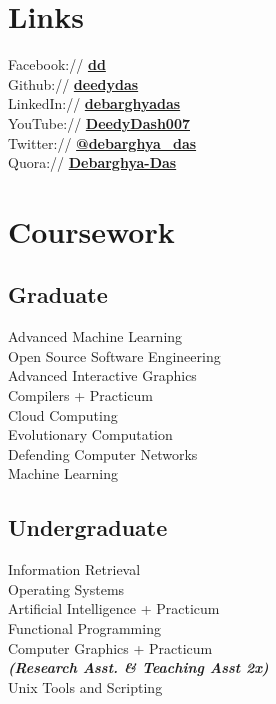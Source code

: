 \documentclass[]{deedy-resume-openfont}
\begin{document}
\begin{minipage}[t]{0.33\textwidth}
    \section{Links}
    Facebook:// \href{https://facebook/dd}{\bf dd} \\
    Github:// \href{https://github.com/deedydas}{\bf deedydas} \\
    LinkedIn://  \href{https://www.linkedin.com/in/debarghyadas}{\bf debarghyadas} \\
    YouTube://  \href{https://www.youtube.com/user/DeedyDash007}{\bf DeedyDash007} \\
    Twitter://  \href{https://twitter.com/debarghya_das}{\bf @debarghya\_das} \\
    Quora://  \href{https://www.quora.com/Debarghya-Das}{\bf Debarghya-Das}


    \section{Coursework}
    \subsection{Graduate}
    Advanced Machine Learning \\
    Open Source Software Engineering \\
    Advanced Interactive Graphics \\
    Compilers + Practicum \\
    Cloud Computing \\
    Evolutionary Computation \\
    Defending Computer Networks \\
    Machine Learning \\
    \sectionsep

    \subsection{Undergraduate}
    Information Retrieval \\
    Operating Systems \\
    Artificial Intelligence + Practicum \\
    Functional Programming \\
    Computer Graphics + Practicum \\
    {\footnotesize \textit{\textbf{(Research Asst. \& Teaching Asst 2x) }}} \\
    Unix Tools and Scripting \\


\end{minipage}
\end{document}
